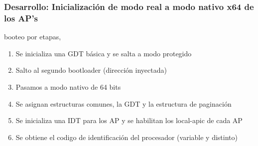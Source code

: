 \documentclass{beamer}
\begin{document}
% 

\begin{frame}
  \frametitle{Desarrollo: \small Inicialización de modo real a modo nativo x64 de los AP's}
  booteo por etapas,\\
\vspace{10pt}
  \begin{enumerate}
    \setlength{\itemsep}{10pt}
   \item Se inicializa una GDT básica y se salta a modo protegido
   \item Salto al segundo bootloader (dirección inyectada)
   \item Pasamos a modo nativo de 64 bits
   \item Se asignan estructuras comunes, la GDT y la estructura de paginación
   \item Se inicializa una IDT para los AP y se habilitan los local-apic de cada AP
   \item Se obtiene el codigo de identificación del procesador (variable y distinto)
  \end{enumerate}


\end{frame}
\end{document}
